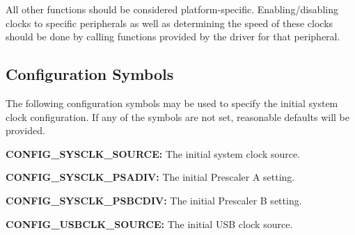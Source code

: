 All other functions should be considered platform-\/specific. Enabling/disabling clocks to specific peripherals as well as determining the speed of these clocks should be done by calling functions provided by the driver for that peripheral.\hypertarget{group__sysclk__group_sysclk_group_config}{}\subsection{Configuration Symbols}\label{group__sysclk__group_sysclk_group_config}
The following configuration symbols may be used to specify the initial system clock configuration. If any of the symbols are not set, reasonable defaults will be provided.
\begin{DoxyItemize}
\item {\bfseries C\-O\-N\-F\-I\-G\-\_\-\-S\-Y\-S\-C\-L\-K\-\_\-\-S\-O\-U\-R\-C\-E\-:} The initial system clock source.
\item {\bfseries C\-O\-N\-F\-I\-G\-\_\-\-S\-Y\-S\-C\-L\-K\-\_\-\-P\-S\-A\-D\-I\-V\-:} The initial Prescaler A setting.
\item {\bfseries C\-O\-N\-F\-I\-G\-\_\-\-S\-Y\-S\-C\-L\-K\-\_\-\-P\-S\-B\-C\-D\-I\-V\-:} The initial Prescaler B setting.
\item {\bfseries C\-O\-N\-F\-I\-G\-\_\-\-U\-S\-B\-C\-L\-K\-\_\-\-S\-O\-U\-R\-C\-E\-:} The initial U\-S\-B clock source. 
\end{DoxyItemize}

